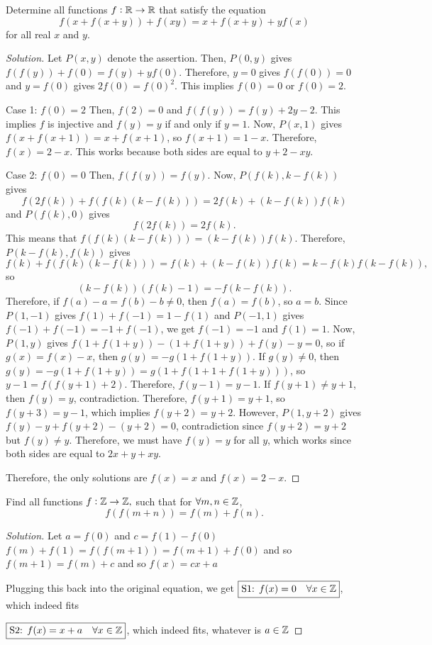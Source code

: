 \begin{prbm}[IMO 2015]
Determine all functions $f:\mathbb R\to\mathbb R$ that satisfy the equation
\[ f(x+f(x+y))+f(xy)=x+f(x+y)+yf(x)\]
for all real $x$ and $y$.
\end{prbm}

\begin{proof}[Solution]
Let $P(x,y)$ denote the assertion. Then, $P(0,y)$ gives $f(f(y))+f(0)=f(y)+yf(0)$. Therefore, $y=0$ gives $f(f(0))=0$ and $y=f(0)$ gives $2f(0)=f(0)^2$. This implies $f(0)=0$ or $f(0)=2$.

Case 1: $f(0)=2$
Then, $f(2)=0$ and $f(f(y))=f(y)+2y-2$. This implies $f$ is injective and $f(y)=y$ if and only if $y=1$. Now, $P(x,1)$ gives $f(x+f(x+1))=x+f(x+1)$, so $f(x+1)=1-x$. Therefore, $f(x)=2-x$. This works because both sides are equal to $y+2-xy$.

Case 2: $f(0)=0$
Then, $f(f(y))=f(y)$. Now, $P(f(k),k-f(k))$ gives$$f(2f(k))+f(f(k)(k-f(k)))=2f(k)+(k-f(k))f(k)$$and $P(f(k),0)$ gives
$$f(2f(k))=2f(k).$$This means that $f(f(k)(k-f(k)))=(k-f(k))f(k)$. Therefore, $P(k-f(k),f(k))$ gives
$$f(k)+f(f(k)(k-f(k)))=f(k)+(k-f(k))f(k)=k-f(k)f(k-f(k)),$$so$$(k-f(k))(f(k)-1)=-f(k-f(k)).$$Therefore, if $f(a)-a=f(b)-b\neq0$, then $f(a)=f(b)$, so $a=b$. Since $P(1,-1)$ gives $f(1)+f(-1)=1-f(1)$ and $P(-1,1)$ gives $f(-1)+f(-1)=-1+f(-1)$, we get $f(-1)=-1$ and $f(1)=1$. Now, $P(1,y)$ gives $f(1+f(1+y))-(1+f(1+y))+f(y)-y=0$, so if $g(x)=f(x)-x$, then $g(y)=-g(1+f(1+y))$. If $g(y)\neq0$, then $g(y)=-g(1+f(1+y))=g(1+f(1+1+f(1+y)))$, so $y-1=f(f(y+1)+2)$. Therefore, $f(y-1)=y-1$. If $f(y+1)\neq y+1$, then $f(y)=y$, contradiction. Therefore, $f(y+1)=y+1$, so $f(y+3)=y-1$, which implies $f(y+2)=y+2$. However, $P(1,y+2)$ gives $f(y)-y+f(y+2)-(y+2)=0$, contradiction since $f(y+2)=y+2$ but $f(y)\neq y$. Therefore, we must have $f(y)=y$ for all $y$, which works since both sides are equal to $2x+y+xy$.

Therefore, the only solutions are $\boxed{f(x)=x}$ and $\boxed{f(x)=2-x}$.
\end{proof}
\pagebreak

\begin{prbm}[CHINA 2016]
Find all functions $f:\mathbb Z\to\mathbb Z,$ such that for $\forall m,n\in\mathbb Z$,
\[ f(f(m+n))=f(m)+f(n).\]
\end{prbm}

\begin{proof}[Solution]
Let $a=f(0)$ and $c=f(1)-f(0)$
$f(m)+f(1)=f(f(m+1))=f(m+1)+f(0)$ and so $f(m+1)=f(m)+c$ and so $f(x)=cx+a$

Plugging this back into the original equation, we get
$\boxed{\text{S1: }f(x)=0\quad\forall x\in\mathbb Z}$, which indeed fits

$\boxed{\text{S2: }f(x)=x+a\quad\forall x\in\mathbb Z}$, which indeed fits, whatever is $a\in\mathbb Z$
\end{proof}
